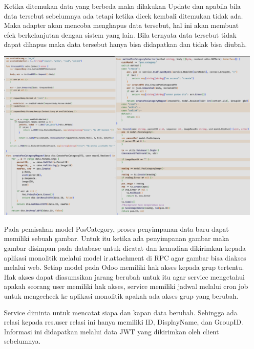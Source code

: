 Ketika ditemukan data yang berbeda maka dilakukan Update dan apabila bila data tersebut sebelumnya ada tetapi ketika dicek kembali ditemukan tidak ada. Maka adapter akan mencoba menghapus data tersebut, hal ini akan membuat efek berkelanjutan dengan sistem yang lain. Bila ternyata data tersebut tidak dapat dihapus maka data tersebut hanya bisa didapatkan dan tidak bisa diubah.

\begin{center}
	\includegraphics[width=14cm]{img/bab_4/strangle_3.png}
	\label{fig:strangle_3}
\end{center}

Pada pemisahan  model PosCategory, proses penyimpanan data baru dapat memiliki sebuah gambar. Untuk itu ketika ada penyimpanan gambar maka gambar disimpan pada database untuk dicatat dan kemudian dikirimkan kepada aplikasi monolitik melalui model ir.attachment di RPC agar gambar bisa diakses melalui web. Setiap model pada Odoo memiliki hak akses kepada grup tertentu. Hak akses dapat diasumsikan jarang berubah untuk itu agar service mengetahui apakah seorang user memiliki hak akses, service memiliki jadwal melalui cron job untuk mengecheck ke aplikasi monolitik apakah ada akses grup yang berubah.

Service diminta untuk mencatat siapa dan kapan data berubah. Sehingga ada relasi kepada res.user relasi ini hanya memiliki ID, DisplayName, dan GroupID. Informasi ini didapatkan melalui data JWT yang dikirimkan oleh client sebelumnya. \\

